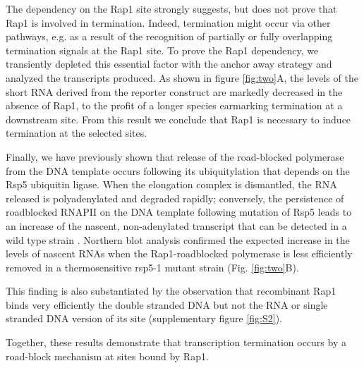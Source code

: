 The dependency on the Rap1 site strongly suggests, but does not prove that Rap1 is involved in termination. Indeed, termination might occur via other pathways, e.g. as a result of the recognition of partially or fully overlapping termination signals at the Rap1 site.  To prove the Rap1 dependency, we transiently depleted this essential factor with the anchor away strategy and analyzed the transcripts produced. As shown in figure \ref{fig:two}A, the levels of the short RNA derived from the reporter construct are markedly decreased in the absence of Rap1, to the profit of a longer species earmarking termination at a downstream site. From this result we conclude that Rap1 is necessary to induce termination at the selected sites. 

Finally, we have previously shown that release of the road-blocked polymerase from the DNA template occurs following its ubiquitylation that depends on the Rsp5 ubiquitin ligase. When the elongation complex is dismantled, the RNA released is polyadenylated and degraded rapidly; conversely, the persistence of roadblocked RNAPII on the DNA template following mutation of Rsp5 leads to an increase of the nascent, non-adenylated transcript that can be detected in a wild type strain \cite{colin:2014:roadblock}. Northern blot analysis confirmed the expected increase in the levels of nascent RNAs when the Rap1-roadblocked polymerase is less efficiently removed in a thermosensitive rsp5-1 mutant strain (Fig. \ref{fig:two}B). 

This finding is also substantiated by the observation that recombinant Rap1 binds very efficiently the double stranded DNA but not the RNA or single stranded DNA version of its site (supplementary figure \ref{fig:S2}). 

Together, these results demonstrate that transcription termination occurs by a road-block mechanism at sites bound by Rap1. 

